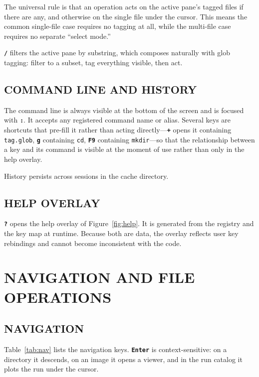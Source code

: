 \documentclass[tm]{ornltm}
\newcommand{\key}[1]{\textbf{\texttt{#1}}}
\begin{document}
The universal rule is that an operation acts on the active pane's tagged files
if there are any, and otherwise on the single file under the cursor. This means
the common single-file case requires no tagging at all, while the multi-file case
requires no separate ``select mode.''

\key{/} filters the active pane by substring, which composes naturally with
glob tagging: filter to a subset, tag everything visible, then act.

\subsection{COMMAND LINE AND HISTORY}

The command line is always visible at the bottom of the screen and is focused
with \key{:}. It accepts any registered command name or alias. Several keys are
shortcuts that pre-fill it rather than acting directly---\key{+} opens it
containing \texttt{tag.glob}, \key{g} containing \texttt{cd}, \key{F9}
containing \texttt{mkdir}---so that the relationship between a key and its
command is visible at the moment of use rather than only in the help overlay.

History persists across sessions in the cache directory.

\subsection{HELP OVERLAY}

\key{?} opens the help overlay of Figure~\ref{fig:help}. It is generated from the
registry and the key map at runtime. Because both are data, the overlay reflects
user key rebindings and cannot become inconsistent with the code.

\section{NAVIGATION AND FILE OPERATIONS}
\label{sec:fileops}

\subsection{NAVIGATION}

Table~\ref{tab:nav} lists the navigation keys. \key{Enter} is context-sensitive:
on a directory it descends, on an image it opens a viewer, and in the run catalog
it plots the run under the cursor.
\end{document}
